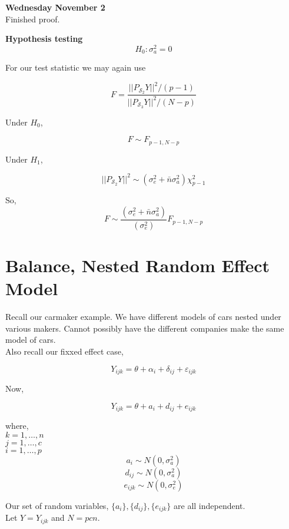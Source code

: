 \documentclass[11pt,fleqn]{book} %
\begin{document}
\textbf{Wednesday November 2}\\

Finished proof. 


\textbf{Hypothesis testing}\\

		$$H_0: \sigma^2_a = 0$$


For our test statistic we may again use

		$$F = \frac{|| P_{\mathcal{S}_2} Y||^2/ (p -1)}{|| P_{\mathcal{S}_3} Y||^2/(N - p)}  $$

Under $H_0$, 

		$$F \sim F_{p - 1, N - p} $$

Under $H_1$, 

		$$ || P_{\mathcal{S}_2} Y||^2 \sim (\sigma^2_e + \bar{n} \sigma_a^2) \chi^2_{p-1}$$

So, 	
		$$F \sim \frac{(\sigma^2_e + \bar{n} \sigma_a^2)}{(\sigma^2_e )} F_{p - 1, N - p} $$



\section{Balance, Nested Random Effect Model}


Recall our carmaker example. We have different models of cars nested under various makers. Cannot possibly have the different companies make the same model of cars. \\


Also recall our fixxed effect case, 

		$$Y_{ijk} = \theta + \alpha_i + \delta_{ij} + \varepsilon_{ijk} $$



Now, 

		$$ Y_{ijk} = \theta + a_i + d_{ij} + e_{ijk}$$

where,\\
$k = 1, \dots, n$\\
$j = 1, \dots, c$\\
$i = 1, \dots, p$\\

		$$a_i \sim N(0, \sigma_a^2)$$
		$$d_{ij} \sim N(0, \sigma_a^2)$$
		$$e_{ijk} \sim N(0, \sigma_e^2)$$

Our set of random variables, $\{a_i\}, \{d_{ij}\}, \{e_{ijk}\}$ are all independent. \\

Let $Y = Y_{ijk}$ and $N = pcn$.
\end{document}
